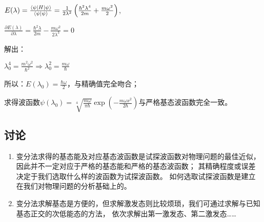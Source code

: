 $E(\lambda ) = \frac{{\left\langle \psi  \right|H\left| \psi  \right\rangle }}{{\left\langle {\psi }
 \mathrel{\left | {\vphantom {\psi  \psi }}
 \right. \kern-\nulldelimiterspace}
 {\psi } \right\rangle }} = \frac{1}{{2\lambda ^2 }}\left( {\frac{{\hbar ^2 \lambda ^4 }}{{2m}} + \frac{{m\omega ^2 }}{2}} \right)$,

$\frac{{\partial E(\lambda )}}{{\partial \lambda }} = \frac{{\hbar ^2 \lambda }}{{2m}} - \frac{{m\omega ^2 }}{{2\lambda ^3 }} = 0$


解出：

$\lambda _0^4  = \frac{{m^2 \omega ^2 }}{{\hbar ^2 }} \Rightarrow \lambda _0^2  = \frac{{m\omega }}{\hbar }$

所以：$E(\lambda _0 ) = \frac{{\hbar \omega }}{2}$，与精确值完全吻合；

求得波函数$\psi (\lambda _0 ) = \sqrt[4]{{\frac{{m\omega }}{{\pi \hbar }}}}\exp \left( { - \frac{{m\omega x^2 }}{{2\hbar }}} \right)$与严格基态波函数完全一致。

\subsection*{讨论}

\begin{enumerate}
    \item 变分法求得的基态能及对应基态波函数是试探波函数对物理问题的最佳近似，
因此并不一定对应于严格的基态能和严格的基态波函数；
其精确程度或误差决定于我们选取什么样的波函数为试探波函数。
如何选取试探波函数是建立在我们对物理问题的分析基础上的。

    \item 变分法求解基态是方便的，但求解激发态则比较烦琐，我们可通过求解与已知基态正交的次低能态的方法，
依次求解出第一激发态、第二激发态……
   \end{enumerate}
